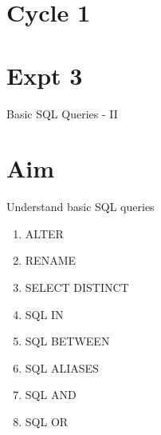 \documentclass[13pt,oneside]{book}
\begin{document}
\section*{Cycle 1}
\section*{Expt 3}
\begin{center}
    \Large{Basic SQL Queries - II}
\end{center}

\section*{Aim}
\large{Understand basic SQL queries
\begin{enumerate}
	\item ALTER
	\item RENAME
	\item SELECT DISTINCT
	\item SQL IN
	\item SQL BETWEEN
	\item SQL ALIASES
	\item SQL AND
	\item SQL OR
\end{enumerate}
}
\end{document}
